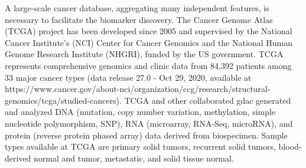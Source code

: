 \documentclass[jpm,article,submit,moreauthors,pdftex]{Definitions/mdpi}
\newenvironment{MyColorPar}[1]{%
    \leavevmode\color{#1}\ignorespaces%
}{%
}%
\begin{document}
\begin{paracol}{2}
\begin{MyColorPar}{red}
A large-scale cancer database, aggregating many independent features, is necessary to facilitate the biomarker discovery.
The Cancer Genome Atlas (TCGA) project\cite{Weinstein2013} has been developed since 2005 and supervised by the National Cancer Institute's (NCI) Center for Cancer Genomics and the National Human Genome Research Institute (NHGRI), funded by the US government.
TCGA represents comprehensive genomics and clinic data from 84,392 patients among 33 major cancer types (data release 27.0 - Oct 29, 2020, available at https://www.cancer.gov/about-nci/organization/ccg/research/structural-genomics/tcga/studied-cancers).
TCGA and other collaborated \acrfull{gdac} generated and analyzed DNA (mutation, copy number variation, methylation, simple nucleotide polymorphism, SNP), RNA (microarray, RNA-Seq, microRNA), and protein (reverse protein phased array) data derived from biospecimen. Sample types available at TCGA are primary solid tumors, recurrent solid tumors, blood-derived normal and tumor, metastatic, and solid tissue normal.  


\end{MyColorPar}
\end{paracol}
\end{document}
